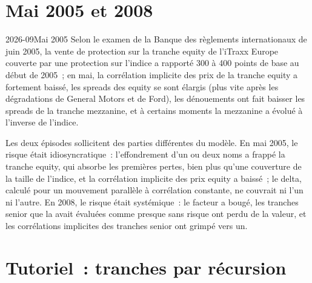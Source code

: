 \section{Mai 2005 et 2008}

\begin{dated}{2026-09}{Mai 2005}\label{dat:rc:portfolio-credit:may2005}
Selon le examen de la Banque des règlements internationaux de juin 2005, la vente de protection sur la
tranche equity de l'iTraxx Europe couverte par une protection sur l'indice a rapporté 300 à
400 points de base au début de 2005~; en mai, la corrélation implicite des prix de la tranche
equity a fortement baissé, les spreads des equity se sont élargis (plus vite après les dégradations
de General Motors et de Ford), les dénouements ont fait baisser les spreads de la tranche mezzanine,
et à certains moments la mezzanine a évolué à l'inverse de l'indice.
\end{dated}

Les deux épisodes sollicitent des parties différentes du modèle. En mai 2005, le risque était
idiosyncratique~: l'effondrement d'un ou deux noms a frappé la tranche equity, qui absorbe les
premières pertes, bien plus qu'une couverture de la taille de l'indice, et la corrélation
implicite des prix equity a baissé~; le delta, calculé pour un mouvement parallèle à corrélation
constante, ne couvrait ni l'un ni l'autre. En 2008, le risque était systémique~: le facteur a bougé,
les tranches senior que la  avait évaluées comme presque sans risque ont perdu de
la valeur, et les corrélations implicites des tranches senior ont grimpé vers un.

\section{Tutoriel~: tranches par récursion}\label{tut:rc:portfolio-credit:tutorial}

